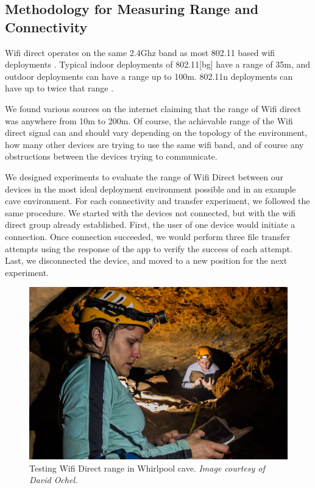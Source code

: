 \documentclass[10pt,twocolumn]{article}
\begin{document}
\subsection{Methodology for Measuring Range and Connectivity}
Wifi direct operates on the same 2.4Ghz band as most 802.11 based wifi deployments \cite{wifiwhitepaper}.
Typical indoor deployments of 802.11[bg] have a range of 35m, and outdoor deployments can have a range up to 100m.
802.11n deployments can have up to twice that range \cite{wikiwifi}.

We found various sources on the internet claiming that the range of Wifi direct was anywhere from 10m to 200m. 
Of course, the achievable range of the Wifi direct signal can and should vary depending on the topology of the environment, how many other devices are trying to use the same wifi band, and of course any obstructions between the devices trying to communicate.

We designed experiments to evaluate the range of Wifi Direct between our devices in the most ideal deployment environment possible and in an example cave environment.
For each connectivity and transfer experiment, we followed the same procedure. 
We started with the devices not connected, but with the wifi direct group already established.
First, the user of one device would initiate a connection.
Once connection succeeded, we would perform three file transfer attempts using the response of the app to verify the success of each attempt.
Last, we disconnected the device, and moved to a new position for the next experiment.

\begin{figure}
\includegraphics[width=\columnwidth]{cavewifi}
\caption{Testing Wifi Direct range in Whirlpool cave. \textit{Image courtesy of David Ochel.}}
\end{figure}
\end{document}
